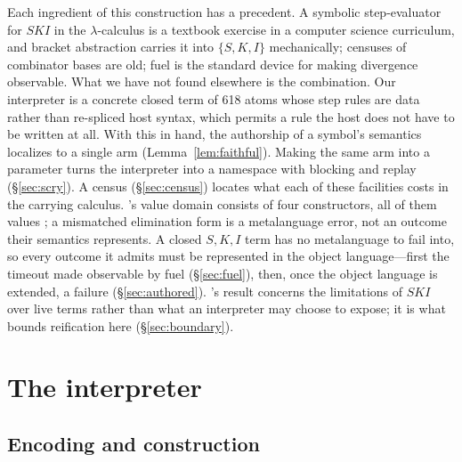 \documentclass[review]{jfp-epi}
\begin{document}
Each ingredient of this construction has a precedent.  A symbolic
step-evaluator for $SKI$ in the $\lambda$-calculus is a textbook
exercise in a computer science curriculum,
and bracket abstraction carries it into $\{S,K,I\}$
mechanically; censuses of combinator bases are old; fuel is the standard
device for making divergence observable.  What we have not found
elsewhere is the combination.  Our interpreter is a concrete closed
term of 618 atoms whose
step rules are data rather than re-spliced host syntax, which permits
a rule the host does not have to be written at
all.  With this in hand, the authorship of a symbol's semantics
localizes to a single arm (Lemma~\ref{lem:faithful}).  Making the same
arm into a parameter turns the interpreter into a namespace with
blocking and replay (\S\ref{sec:scry}).  A census (\S\ref{sec:census})
locates what each of these facilities costs in the carrying calculus.
\citeauthor{AminRompf2018}'s value domain consists of four constructors,
all of them values \citep[p.~6]{AminRompf2018}; a mismatched
elimination form is a metalanguage error, not an outcome their
semantics represents. A closed ${S,K,I}$ term has no metalanguage to
fail into, so every outcome it admits must be represented in the object
language---first the timeout made observable by fuel (\S\ref{sec:fuel}),
then, once the object language is extended, a failure
(\S\ref{sec:authored}).  \citeauthor{JayGivenWilson2011}'s result
concerns the limitations of $SKI$ over live terms rather than what an
interpreter may choose to expose; it is what bounds reification here
(\S\ref{sec:boundary}).

\section{The interpreter}\label{sec:interp}

\subsection{Encoding and construction}\label{sec:construction}
\end{document}
